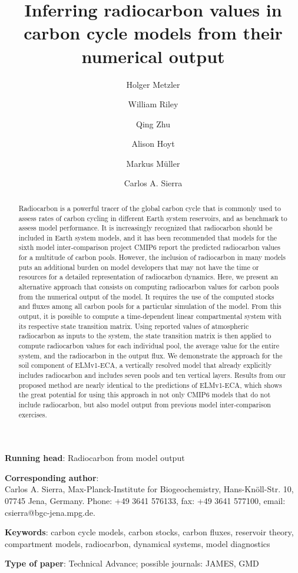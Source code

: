 \documentclass[11pt,a4paper]{article}
\title{\bf Inferring radiocarbon values in carbon cycle models from their numerical output}
\author[1]{Holger Metzler}
\author[2]{William Riley}
\author[2]{Qing Zhu}
\author[1]{Alison Hoyt}
\author[1]{Markus M\"uller}
\author[1]{Carlos A. Sierra}
\affil[1]{\it \small Max Planck Institute for Biogeochemistry, Hans-Kn\"oll-Str. 10, 07745 Jena, Germany}
\affil[2]{\it Climate and Ecosystem Sciences Division, Lawrence Berkeley National Laboratory, Berkeley 94720, USA}
\date{}
\begin{document}
\doublespace
\maketitle

\noindent
{\bf Running head}: Radiocarbon from model output

\vspace{2em}

\noindent
\textbf{Corresponding author}: \\ Carlos A. Sierra, Max-Planck-Institute for Biogeochemistry, Hans-Kn\"{o}ll-Str. 10, 07745 Jena, Germany. Phone: +49 3641 576133, fax: +49 3641 577100, email: csierra@bgc-jena.mpg.de.

\vspace{2em}

\noindent
{\bf Keywords}: carbon cycle models, carbon stocks, carbon fluxes, reservoir theory, compartment models, radiocarbon, dynamical systems,  model diagnostics

\vspace{2em}

\noindent
{\bf Type of paper}: Technical Advance; possible journals: JAMES, GMD
\newpage
\linenumbers

\begin{abstract}
Radiocarbon is a powerful tracer of the global carbon cycle that is commonly used to assess rates of carbon cycling in different Earth system reservoirs, and as benchmark to assess model performance. It is increasingly recognized that radiocarbon should be included in Earth system models, and it has been recommended that models for the sixth model inter-comparison project CMIP6 report the predicted radiocarbon values for a multitude of carbon pools. However, the inclusion of radiocarbon in many models puts an additional burden on model developers that may not have the time or resources for a detailed representation of radiocarbon dynamics. Here, we present an alternative approach that consists on computing radiocarbon values for carbon pools from the numerical output of the model. It requires the use of the computed stocks and fluxes among all carbon pools for a particular simulation of the model. From this output, it is possible to compute a time-dependent linear compartmental system with its respective state transition matrix. Using reported values of atmospheric radiocarbon as inputs to the system, the state transition matrix is then applied to compute radiocarbon values for each individual pool, the average value for the entire system, and the radiocarbon in the output flux. 
We demonstrate the approach for the soil component of ELMv1-ECA, a vertically resolved model that already explicitly includes radiocarbon and includes seven pools and ten vertical layers. Results from our proposed method are nearly identical to the predictions of ELMv1-ECA, which shows the great potential for using this approach in not only CMIP6 models that do not include radiocarbon, but also model output from previous model inter-comparison exercises. 
\end{abstract}
\end{document}
